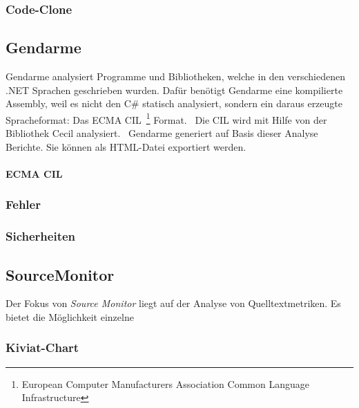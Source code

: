 \subsubsection{Code-Clone}


\subsection{Gendarme}
\label{sec:gendarme}
Gendarme analysiert Programme und Bibliotheken, welche in den verschiedenen .NET Sprachen geschrieben wurden. Dafür benötigt Gendarme eine kompilierte Assembly, weil es nicht den C\# statisch analysiert, sondern ein daraus erzeugte Spracheformat: Das ECMA CIL~\footnote{European Computer Manufacturers Association Common Language Infrastructure} Format.~\cite{ecma} Die CIL wird mit Hilfe von der Bibliothek Cecil analysiert.~\cite{cecil} Gendarme generiert auf Basis dieser Analyse Berichte. Sie können als HTML-Datei exportiert werden.

\paragraph{ECMA CIL}

\subsubsection{Fehler}

\subsubsection{Sicherheiten}


\subsection{SourceMonitor}
Der Fokus von \emph{Source Monitor} liegt auf der Analyse von Quelltextmetriken. Es bietet die Möglichkeit einzelne 

\subsubsection{Kiviat-Chart}

